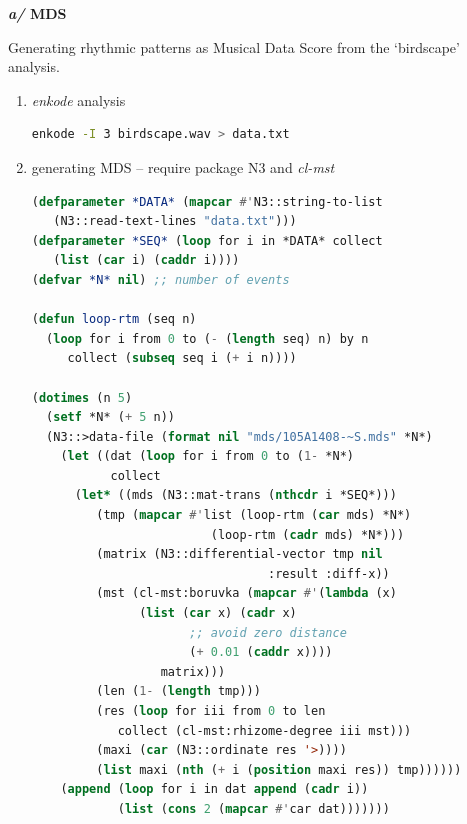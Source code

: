   \textbf{\textit{a/} MDS }
  
  \smallskip
  Generating rhythmic patterns as Musical Data Score from the `birdscape' analysis.
  
 \begin{enumerate}
\item \textsl{enkode} analysis
 
\begin{lstlisting}[basicstyle=\footnotesize\ttfamily,language=Bash]
enkode -I 3 birdscape.wav > data.txt
\end{lstlisting}

\item generating MDS -- require package N3 and \textsl{cl-mst}
\begin{lstlisting}[basicstyle=\footnotesize\ttfamily,language=Lisp]
(defparameter *DATA* (mapcar #'N3::string-to-list 
   (N3::read-text-lines "data.txt")))
(defparameter *SEQ* (loop for i in *DATA* collect 
   (list (car i) (caddr i))))
(defvar *N* nil) ;; number of events

(defun loop-rtm (seq n)
  (loop for i from 0 to (- (length seq) n) by n 
     collect (subseq seq i (+ i n))))
     
(dotimes (n 5)
  (setf *N* (+ 5 n))
  (N3::>data-file (format nil "mds/105A1408-~S.mds" *N*) 
    (let ((dat (loop for i from 0 to (1- *N*) 
           collect
	  (let* ((mds (N3::mat-trans (nthcdr i *SEQ*)))
		 (tmp (mapcar #'list (loop-rtm (car mds) *N*) 
			             (loop-rtm (cadr mds) *N*)))
		 (matrix (N3::differential-vector tmp nil 
		                         :result :diff-x))
		 (mst (cl-mst:boruvka (mapcar #'(lambda (x) 
		       (list (car x) (cadr x) 
		              ;; avoid zero distance
		              (+ 0.01 (caddr x)))) 
		          matrix)))
		 (len (1- (length tmp)))
		 (res (loop for iii from 0 to len 
			collect (cl-mst:rhizome-degree iii mst)))
		 (maxi (car (N3::ordinate res '>))))
	     (list maxi (nth (+ i (position maxi res)) tmp))))))
	(append (loop for i in dat append (cadr i)) 
	        (list (cons 2 (mapcar #'car dat)))))))
\end{lstlisting}
\end{enumerate}


